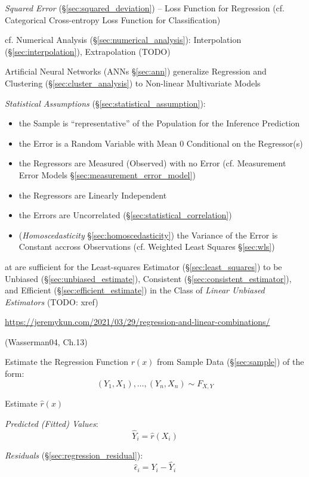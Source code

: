 \emph{Squared Error} (\S\ref{sec:squared_deviation}) -- Loss Function for
Regression (cf. Categorical Cross-entropy Loss Function for Classification)

cf. Numerical Analysis (\S\ref{sec:numerical_analysis}): Interpolation
(\S\ref{sec:interpolation}), Extrapolation (TODO)

\fist Artificial Neural Networks (ANNs \S\ref{sec:ann}) generalize Regression
and Clustering (\S\ref{sec:cluster_analysis}) to Non-linear Multivariate Models

\emph{Statistical Assumptions} (\S\ref{sec:statistical_assumption}):
\begin{itemize}
  \item the Sample is ``representative'' of the Population for the Inference
    Prediction
  \item the Error is a Random Variable with Mean $0$ Conditional on the
    Regressor(s)
  \item the Regressors are Measured (Observed) with no Error (cf. Measurement
    Error Models \S\ref{sec:measurement_error_model})
  \item the Regressors are Linearly Independent
  \item the Errors are Uncorrelated (\S\ref{sec:statistical_correlation})
  \item (\emph{Homoscedasticity} \S\ref{sec:homoscedasticity}) the Variance of
    the Error is Constant accross Observations (cf. Weighted Least Squares
    \S\ref{sec:wls})
\end{itemize}
at are sufficient for the Least-squares Estimator (\S\ref{sec:least_squares}) to
be Unbiased (\S\ref{sec:unbiased_estimate}), Consistent
(\S\ref{sec:consistent_estimator}), and Efficient
(\S\ref{sec:efficient_estimate}) in the Class of \emph{Linear Unbiased
  Estimators} (TODO: xref)

\url{https://jeremykun.com/2021/03/29/regression-and-linear-combinations/}

\asterism

(Wasserman04, Ch.13)

Estimate the Regression Function $r(x)$ from Sample Data (\S\ref{sec:sample}) of
the form:
\[
  (Y_1,X_1), \ldots, (Y_n,X_n) \sim F_{X,Y}
\]

Estimate $\hat{r}(x)$

\emph{Predicted (Fitted) Values}:
\[
  \hat{Y}_i = \hat{r}(X_i)
\]

\emph{Residuals} (\S\ref{sec:regression_residual}):
\[
  \hat{\epsilon}_i = Y_i - \hat{Y}_i
\]

